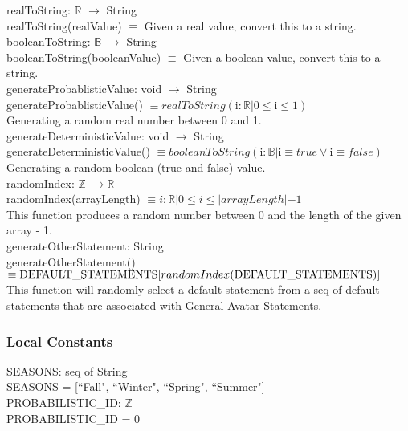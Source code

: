 \documentclass[12pt, titlepage]{article}
\begin{document}
\noindent realToString: $\mathbb{R}$  $\rightarrow$ String\\
realToString(realValue) $\equiv$ Given a real value, convert this to a string.  \\

\noindent booleanToString: $\mathbb{B}$  $\rightarrow$ String\\
booleanToString(booleanValue) $\equiv$ Given a boolean value, convert this to a string.  \\

\noindent generateProbablisticValue: void  $\rightarrow$ String\\
generateProbablisticValue() $\equiv realToString(\text{i} : \mathbb{R} | 0\le \text{i} \le 1) $  \\   
Generating a random real number between 0 and 1.\\

\noindent generateDeterministicValue: void  $\rightarrow$ String\\
generateDeterministicValue() $\equiv booleanToString(\text{i} : \mathbb{B} | \text{i}\equiv true \lor \text{i}\equiv false)$ \\
Generating a random boolean (true and false) value. \\

\noindent randomIndex: $\mathbb{Z}$ $\rightarrow \mathbb{R}$  \\
randomIndex(arrayLength) $\equiv i : \mathbb{R} | 0 \le i \le |arrayLength| - 1 $ \\
This function produces a random number between 0 and the length of the given array - 1. \\

\noindent generateOtherStatement: String\\
generateOtherStatement() $\equiv \newline \text{DEFAULT\_STATEMENTS}[randomIndex(\text{DEFAULT\_STATEMENTS)}]$  \\
This function will randomly select a default statement from a seq of default statements that are associated with General Avatar Statements.


\subsubsection{Local Constants}
SEASONS: seq of String\\
SEASONS = [``Fall", ``Winter", ``Spring", ``Summer"]\\

\noindent PROBABILISTIC\_ID: $\mathbb{Z}$\\
PROBABILISTIC\_ID = 0\\
\end{document}

